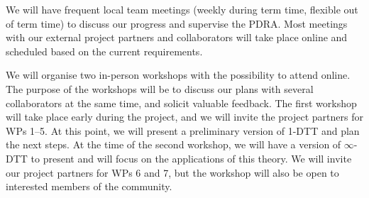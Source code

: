 \documentclass[a4paper,11pt]{article}
\begin{document}
We will have frequent local team meetings (weekly during term time, flexible out of term time) to discuss our progress and supervise the PDRA.
Most meetings with our external project partners and collaborators will take place online and scheduled based on the current requirements.

We will organise two in-person workshops with the possibility to attend online.
The purpose of the workshops will be to discuss our plans with several collaborators at the same time, and solicit valuable feedback.
The first workshop will take place early during the project, and we will invite the project partners for WPs 1--5.
At this point, we will present a preliminary version of 1-DTT and plan the next steps.
At the time of the second workshop, we will have a version of $\infty$-DTT to present and will focus on the applications of this theory. We will invite our project partners for WPs 6 and 7, but the workshop will also be open to interested members of the community.



\newpage


\printbibliography
\end{document}
